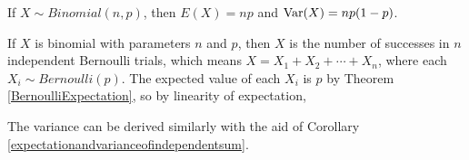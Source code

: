 \begin{thm}If $X \sim Binomial(n,p)$, then $E(X) = np$ and $\operatorname{Var}(X) = np(1-p)$.
\end{thm}
\begin{pf}
If $X$ is binomial with parameters $n$ and $p$, then $X$ is the number of successes in $n$ independent Bernoulli trials, which means $X = X_1 + X_2 + \cdots + X_n$, where each $X_i \sim Bernoulli(p)$. The expected value of each $X_i$ is $p$ by Theorem \ref{BernoulliExpectation}, so by linearity of expectation,
\par
\noindent The variance can be derived similarly with the aid of Corollary \ref{expectationandvarianceofindependentsum}.
\end{pf}
\par

